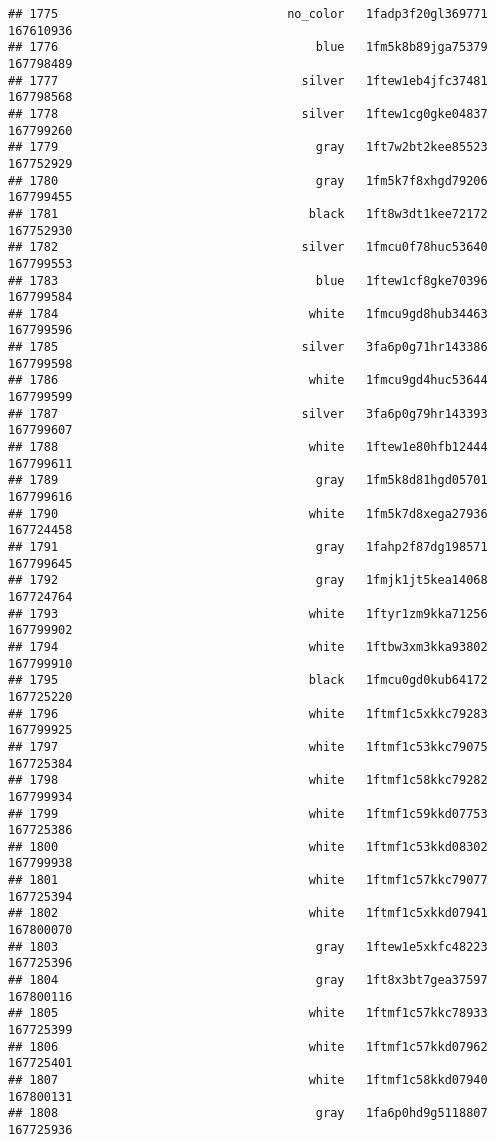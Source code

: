 \documentclass[
]{article}
\begin{document}
\begin{verbatim}
## 1775                                no_color   1fadp3f20gl369771 167610936
## 1776                                    blue   1fm5k8b89jga75379 167798489
## 1777                                  silver   1ftew1eb4jfc37481 167798568
## 1778                                  silver   1ftew1cg0gke04837 167799260
## 1779                                    gray   1ft7w2bt2kee85523 167752929
## 1780                                    gray   1fm5k7f8xhgd79206 167799455
## 1781                                   black   1ft8w3dt1kee72172 167752930
## 1782                                  silver   1fmcu0f78huc53640 167799553
## 1783                                    blue   1ftew1cf8gke70396 167799584
## 1784                                   white   1fmcu9gd8hub34463 167799596
## 1785                                  silver   3fa6p0g71hr143386 167799598
## 1786                                   white   1fmcu9gd4huc53644 167799599
## 1787                                  silver   3fa6p0g79hr143393 167799607
## 1788                                   white   1ftew1e80hfb12444 167799611
## 1789                                    gray   1fm5k8d81hgd05701 167799616
## 1790                                   white   1fm5k7d8xega27936 167724458
## 1791                                    gray   1fahp2f87dg198571 167799645
## 1792                                    gray   1fmjk1jt5kea14068 167724764
## 1793                                   white   1ftyr1zm9kka71256 167799902
## 1794                                   white   1ftbw3xm3kka93802 167799910
## 1795                                   black   1fmcu0gd0kub64172 167725220
## 1796                                   white   1ftmf1c5xkkc79283 167799925
## 1797                                   white   1ftmf1c53kkc79075 167725384
## 1798                                   white   1ftmf1c58kkc79282 167799934
## 1799                                   white   1ftmf1c59kkd07753 167725386
## 1800                                   white   1ftmf1c53kkd08302 167799938
## 1801                                   white   1ftmf1c57kkc79077 167725394
## 1802                                   white   1ftmf1c5xkkd07941 167800070
## 1803                                    gray   1ftew1e5xkfc48223 167725396
## 1804                                    gray   1ft8x3bt7gea37597 167800116
## 1805                                   white   1ftmf1c57kkc78933 167725399
## 1806                                   white   1ftmf1c57kkd07962 167725401
## 1807                                   white   1ftmf1c58kkd07940 167800131
## 1808                                    gray   1fa6p0hd9g5118807 167725936

\end{verbatim}
\end{document}
